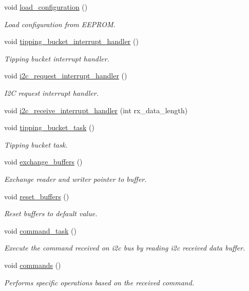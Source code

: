 \begin{DoxyCompactItemize}
void \hyperlink{i2c-rain_8ino_a32a64a2800c724fb28e10636f2ec20b9}{load\+\_\+configuration} ()
\begin{DoxyCompactList}\small\item\em Load configuration from E\+E\+P\+R\+OM. \end{DoxyCompactList}\item 
void \hyperlink{i2c-rain_8ino_a368e45fb147aecb0fd1478d3cc76fba7}{tipping\+\_\+bucket\+\_\+interrupt\+\_\+handler} ()
\begin{DoxyCompactList}\small\item\em Tipping bucket interrupt handler. \end{DoxyCompactList}\item 
void \hyperlink{i2c-rain_8ino_ac816bd8aafe77e7a571574c8a26eead5}{i2c\+\_\+request\+\_\+interrupt\+\_\+handler} ()
\begin{DoxyCompactList}\small\item\em I2C request interrupt handler. \end{DoxyCompactList}\item 
void \hyperlink{i2c-rain_8ino_a6e27532df66f6bf186654355def5c9af}{i2c\+\_\+receive\+\_\+interrupt\+\_\+handler} (int rx\+\_\+data\+\_\+length)
\item 
void \hyperlink{i2c-rain_8ino_a009edfb36e6432603ed0ede845e2c12d}{tipping\+\_\+bucket\+\_\+task} ()
\begin{DoxyCompactList}\small\item\em Tipping bucket task. \end{DoxyCompactList}\item 
void \hyperlink{i2c-rain_8ino_a46696a96b3118b5d8900703c054166c8}{exchange\+\_\+buffers} ()
\begin{DoxyCompactList}\small\item\em Exchange reader and writer pointer to buffer. \end{DoxyCompactList}\item 
void \hyperlink{i2c-rain_8ino_a07daf3835b622d4d3451690f603845c1}{reset\+\_\+buffers} ()
\begin{DoxyCompactList}\small\item\em Reset buffers to default value. \end{DoxyCompactList}\item 
void \hyperlink{i2c-rain_8ino_a42389aceb96a84573eb67e6d141cb594}{command\+\_\+task} ()
\begin{DoxyCompactList}\small\item\em Execute the command received on i2c bus by reading i2c received data buffer. \end{DoxyCompactList}\item 
void \hyperlink{i2c-rain_8ino_a4981066e183f1432ffd6eddf55826585}{commands} ()
\begin{DoxyCompactList}\small\item\em Performs specific operations based on the received command. \end{DoxyCompactList}\end{DoxyCompactItemize}


